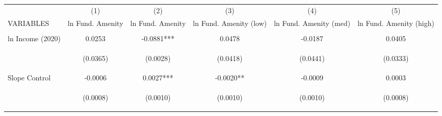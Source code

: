 
\begin{tabular}{lccccc} \hline
 & (1) & (2) & (3) & (4) & (5) \\
VARIABLES & ln Fund. Amenity & ln Fund. Amenity & ln Fund. Amenity (low) & ln Fund. Amenity (med) & ln Fund. Amenity (high) \\ \hline
\vspace{4pt} & \begin{footnotesize}\end{footnotesize} & \begin{footnotesize}\end{footnotesize} & \begin{footnotesize}\end{footnotesize} & \begin{footnotesize}\end{footnotesize} & \begin{footnotesize}\end{footnotesize} \\
ln Income (2020) & 0.0253 & -0.0881*** & 0.0478 & -0.0187 & 0.0405 \\
\vspace{4pt} & \begin{footnotesize}(0.0365)\end{footnotesize} & \begin{footnotesize}(0.0028)\end{footnotesize} & \begin{footnotesize}(0.0418)\end{footnotesize} & \begin{footnotesize}(0.0441)\end{footnotesize} & \begin{footnotesize}(0.0333)\end{footnotesize} \\
Slope Control & -0.0006 & 0.0027*** & -0.0020** & -0.0009 & 0.0003 \\
\vspace{4pt} & \begin{footnotesize}(0.0008)\end{footnotesize} & \begin{footnotesize}(0.0010)\end{footnotesize} & \begin{footnotesize}(0.0010)\end{footnotesize} & \begin{footnotesize}(0.0010)\end{footnotesize} & \begin{footnotesize}(0.0008)\end{footnotesize} \\

\end{tabular}
